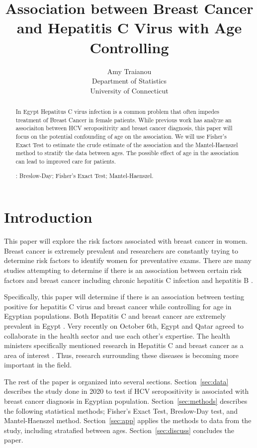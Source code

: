 \documentclass[12pt, titlepage]{article}
\title{Association between Breast Cancer and Hepatitis C Virus with Age Controlling}
\author{Amy Traianou\\
  Department of Statistics\\
  University of Connecticut
}
\begin{document}
\maketitle


\begin{abstract}
In Egypt Hepatitus C virus infection is a common problem that often impedes treatment
of Breast Cancer in female patients. While previous work has analyze an associaiton 
between HCV seropositivity and breast cancer diagnosis, this paper will focus on the 
potential confounding of age on the association. We will use Fisher's Exact Test to
estimate the crude estimate of the association and the Mantel-Haenszel method to 
stratify the data between ages. The possible effect of age in the association can
lead to improved care for patients. 


\bigskip
{}:
Breslow-Day;
Fisher's Exact Test;
Mantel-Haenszel.
\end{abstract}


\section{Introduction}
\label{sec:intro}

This paper will explore the risk factors associated with breast cancer in women. Breast cancer is extremely
prevalent and researchers are constantly trying to determine risk factors to identify women for preventative exams.
There are many studies attempting to determine if there is an association between certain risk factors and 
breast cancer including chronic hepatitis C infection \citep{Larrey2010is} and hepatitis B \citep{vishnu2016does}. 

Specifically, this paper will determine if there is an association between testing positive for hepatitis C virus
and breast cancer while controlling for age in Egyptian populations. Both Hepatitis C and breast 
cancer are extremely prevalent in Egypt \citep{Hussein2021high}. Very recently on October 6th, 
Egypt and Qatar agreed to collaborate in the health sector and use each 
other's expertise. The health ministers specifically mentioned research in Hepatitis C and breast cancer
as a area of interest \citep{arham2022egypt}. Thus, research surrounding these diseases is becoming more
important in the field. 

The rest of the paper is organized into several sections. Section~\ref{sec:data}
describes the study done in 2020 to test if HCV seropositivity is associated with 
breast cancer diagnosis in Egyptian population. Section~\ref{sec:methods} 
describes the following statistical methods; Fisher's Exact Test, Breslow-Day test,
and Mantel-Haenszel method.
Section~\ref{sec:app} applies the methods to data from the study, including
stratafied between ages.
Section~\ref{sec:discuss} concludes the paper.
\end{document}
